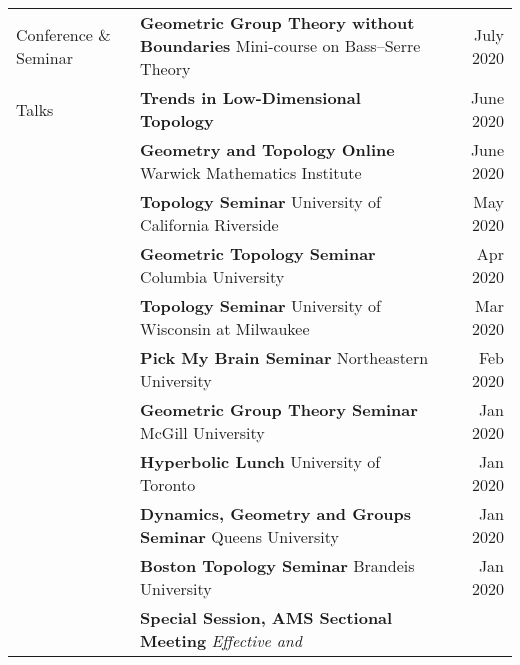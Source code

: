 \documentclass[10pt,letterpaper]{article}
\begin{document}
\begin{xltabular}{\textwidth}{HXr}
	Conference \newline \& Seminar 
  & \textbf{Geometric Group Theory without Boundaries}
  \newline\hspace*{2pc} Mini-course on Bass--Serre Theory
  & July 2020 \\
  Talks
  & \textbf{Trends in Low-Dimensional Topology}
  & June 2020 \\
  & \textbf{Geometry and Topology Online}
  \newline\hspace*{2pc} Warwick Mathematics Institute
  & June 2020 \\
  & \textbf{Topology Seminar}
  \newline\hspace*{2pc} University of California Riverside
  & May 2020 \\
  & \textbf{Geometric Topology Seminar}
  \newline\hspace*{2pc} Columbia University
  & Apr 2020 \\
  & \textbf{Topology Seminar}
  \newline\hspace*{2pc} University of Wisconsin at Milwaukee
  & Mar 2020 \\
  & \textbf{Pick My Brain Seminar}
  \newline\hspace*{2pc} Northeastern University
  & Feb 2020 \\
  & \textbf{Geometric Group Theory Seminar}
  \newline\hspace*{2pc} McGill University
  & Jan 2020 \\
  & \textbf{Hyperbolic Lunch}
  \newline\hspace*{2pc} University of Toronto
  & Jan 2020 \\
  & \textbf{Dynamics, Geometry and Groups Seminar}
  \newline\hspace*{2pc} Queens University
  & Jan 2020 \\
  & \textbf{Boston Topology Seminar}
  \newline\hspace*{2pc} Brandeis University
  & Jan 2020 \\
  & \textbf{Special Session, AMS Sectional Meeting} 
  \newline\hspace*{2pc} \emph{Effective and 
}
\end{xltabular}
\end{document}

